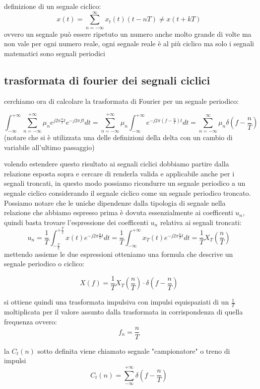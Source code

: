 \documentclass{article}
\begin{document}
definizione di un segnale ciclico:
$$x(t) = \sum\limits_{n=-\infty}^{\infty} x_t(t)(t-nT) \neq x(t+kT)$$
ovvero un segnale può essere ripetuto un numero anche molto grande di volte ma non vale per ogni numero reale,
ogni segnale reale è al più ciclico ma solo i segnali matematici sono segnali periodici


\subsection{trasformata di fourier dei segnali ciclici}
cerchiamo ora di calcolare la trasformata di Fourier per un segnale periodico:

$$\int_{-\infty}^{+\infty} \sum\limits_{n=-\infty}^{+\infty} \mu_n e^{j 2\pi \frac{n}{T}t}e^{-j 2\pi ft}dt =
\sum\limits_{n=-\infty}^{+\infty} \mu_n  \int_{-\infty}^{+\infty}e^{-j 2\pi (f-\frac{n}{T})t}dt =
\sum\limits_{n=-\infty}^{\infty} \mu_n  \delta(f - \frac{n}{T})$$
(notare che si è utilizzata una delle definizioni della delta con un cambio di variabile all'ultimo passaggio)

volendo estendere questo risultato ai segnali ciclici dobbiamo partire dalla relazione esposta sopra e cercare di renderla valida e applicabile anche per i segnali troncati, in questo modo possiamo ricondurre un segnale periodico a un segnale ciclico considerando il segnale ciclico come un segnale periodico troncato.
Possiamo notare che le uniche dipendenze dalla tipologia di segnale nella relazione che abbiamo espresso
prima è dovuta essenzialmente ai coefficenti $u_n$, quindi basta trovare l'espressione dei coefficenti $u_n$ relativa ai segnali troncati:
 $$u_n = \frac{1}{T} \int_{-\frac{T}{2}}^{+\frac{T}{2}} x(t)e^{-j 2\pi \frac{n}{T}t}dt =
 \frac{1}{T} \int_{-\infty}^{+\infty} x_T(t)e^{-j 2\pi \frac{n}{T}t}dt =
  \frac{1}{T} X_T(\frac{n}{T})$$
mettendo assieme le due espressioni otteniamo una formula che descrive un segnale periodico o ciclico:

$$X(f)=\frac{1}{T} X_T(\frac{n}{T})\cdot\delta(f-\frac{n}{T})$$

si ottiene quindi una trasformata impulsiva con impulsi equispaziati di un $\frac{1}{T}$
moltiplicata per il valore assunto dalla trasformata in corrispondenza di quella frequenza ovvero:
$$f_n = \frac{n}{T}$$

la $C_t(n)$ sotto definita viene chiamato segnale "campionatore" o treno di impulsi
$$C_t(n) = \sum_{-\infty}^{+\infty}\delta(f-\frac{n}{T})$$
\end{document}
